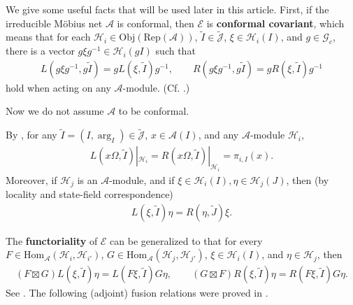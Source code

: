 \documentclass[12pt,a4paper,notitlepage]{article}
\theoremstyle{definition}
\theoremstyle{plain}
\newcommand{\mc}{\mathcal}
\newcommand{\wtd}{\widetilde}
\newcommand{\Hom}{\mathrm{Hom}}
\newcommand{\scr}{\mathscr}
\newcommand{\Jtd}{\widetilde{\mathcal J}}
\newcommand{\RepA}{\mathrm{Rep}(\mathcal A)}
\newcommand{\Gc}{\mathscr G_c}
\newcommand{\Obj}{\mathrm{Obj}}
\numberwithin{equation}{section}
\begin{document}
We give some useful facts that will be used later in this article. First, if the irreducible M\"obius net $\mc A$ is conformal, then $\scr E$ is \textbf{conformal covariant}, which means that for each $\mc H_i\in\Obj(\RepA)$, $\wtd I\in\Jtd$, $\xi\in\mc H_i(I)$, and $g\in\Gc$, there is a vector $g\xi g^{-1}\in\mc H_i(gI)$ such that
\begin{align}
L(g\xi g^{-1},g\wtd I)=gL(\xi,\wtd I)g^{-1},\qquad R(g\xi g^{-1},g\wtd I)=gR(\xi,\wtd I)g^{-1}\label{eq17}
\end{align}
hold when acting on any $\mc A$-module. (Cf. \cite[Thm. 3.13]{Gui21a}.) 



Now we do not assume $\mc A$ to be conformal.  

By \cite[Rem. 2.2]{Gui21b}, for any $\wtd I=(I,\arg_I)\in\Jtd$, $x\in\mc A(I)$, and any $\mc A$-module $\mc H_i$,
\begin{align}
L(x\Omega,\wtd I)|_{\mc H_i}=R(x\Omega,\wtd I)|_{\mc H_i}=\pi_{i,I}(x).	\label{eq5}
\end{align}
Moreover, if $\mc H_j$ is an $\mc A$-module, and if $\xi\in\mc H_i(I),\eta\in\mc H_j(J)$, then (by locality and state-field correspondence)
\begin{align}
	L(\xi,\wtd I)\eta=R(\eta,\wtd J)\xi.\label{eq25}
\end{align}

The \textbf{functoriality} of $\scr E$ can be generalized to that for every $F\in\Hom_{\mc A}(\mc H_i,\mc H_{i'})$, $G\in\Hom_{\mc A}(\mc H_j,\mc H_{j'})$,  $\xi\in\mc H_i(I)$, and $\eta\in\mc H_j$, then
\begin{align}
	(F\boxtimes G)L(\xi,\wtd I)\eta=L(F\xi,\wtd I)G\eta,\qquad (G\boxtimes F)R(\xi,\wtd I)\eta=R(F\xi,\wtd I)G\eta.\label{eq2}
\end{align}
See \cite[Sec. 2]{Gui21b}. The following (adjoint) fusion relations were  proved in \cite[Prop. 2.3]{Gui21b}.
\end{document}
